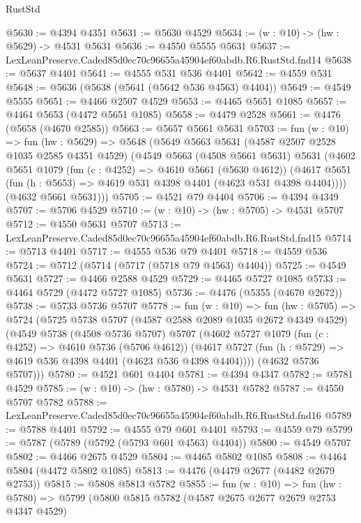 \begin{lexlean}{RustStd}
\begin{coremodule}
@5630 := @4394 @4351
@5631 := @5630 @4529
@5634 := (w : @10) -> (hw : @5629) -> @4531 @5631
@5636 := @4550 @5555 @5631
@5637 := LexLeanPreserve.Caded85d0ec70c96655a45904ef60abdb.R6.RustStd.fnd14
@5638 := @5637 @4401
@5641 := @4555 @531 @536 @4401
@5642 := @4559 @531
@5648 := @5636 (@5638 (@5641 (@5642 @536 @4563) @4404))
@5649 := @4549 @5555
@5651 := @4466 @2507 @4529
@5653 := @4465 @5651 @1085
@5657 := @4464 @5653 (@4472 @5651 @1085)
@5658 := @4479 @2528
@5661 := @4476 (@5658 (@4670 @2585))
@5663 := @5657 @5661 @5631
@5703 := fun (w : @10) =>
  fun (hw : @5629) =>
  @5648
    (@5649
      @5663
      @5631
      (@4587 @2507 @2528 @1035 @2585 @4351 @4529)
      (@4549
        @5663
        (@4508 @5661 @5631)
        @5631
        (@4602
          @5651
          @1079
          (fun (c : @4252) => @4610 @5661 (@5630 @4612))
          (@4617 @5651 (fun (h : @5653) => @4619 @531 @4398 @4401 (@4623 @531 @4398 @4404))))
        (@4632 @5661 @5631)))
@5705 := @4521 @79 @4404
@5706 := @4394 @4349
@5707 := @5706 @4529
@5710 := (w : @10) -> (hw : @5705) -> @4531 @5707
@5712 := @4550 @5631 @5707
@5713 := LexLeanPreserve.Caded85d0ec70c96655a45904ef60abdb.R6.RustStd.fnd15
@5714 := @5713 @4401
@5717 := @4555 @536 @79 @4401
@5718 := @4559 @536
@5724 := @5712 (@5714 (@5717 (@5718 @79 @4563) @4404))
@5725 := @4549 @5631
@5727 := @4466 @2588 @4529
@5729 := @4465 @5727 @1085
@5733 := @4464 @5729 (@4472 @5727 @1085)
@5736 := @4476 (@5355 (@4670 @2672))
@5738 := @5733 @5736 @5707
@5778 := fun (w : @10) =>
  fun (hw : @5705) =>
  @5724
    (@5725
      @5738
      @5707
      (@4587 @2588 @2089 @1035 @2672 @4349 @4529)
      (@4549
        @5738
        (@4508 @5736 @5707)
        @5707
        (@4602
          @5727
          @1079
          (fun (c : @4252) => @4610 @5736 (@5706 @4612))
          (@4617 @5727 (fun (h : @5729) => @4619 @536 @4398 @4401 (@4623 @536 @4398 @4404))))
        (@4632 @5736 @5707)))
@5780 := @4521 @601 @4404
@5781 := @4394 @4347
@5782 := @5781 @4529
@5785 := (w : @10) -> (hw : @5780) -> @4531 @5782
@5787 := @4550 @5707 @5782
@5788 := LexLeanPreserve.Caded85d0ec70c96655a45904ef60abdb.R6.RustStd.fnd16
@5789 := @5788 @4401
@5792 := @4555 @79 @601 @4401
@5793 := @4559 @79
@5799 := @5787 (@5789 (@5792 (@5793 @601 @4563) @4404))
@5800 := @4549 @5707
@5802 := @4466 @2675 @4529
@5804 := @4465 @5802 @1085
@5808 := @4464 @5804 (@4472 @5802 @1085)
@5813 := @4476 (@4479 @2677 (@4482 @2679 @2753))
@5815 := @5808 @5813 @5782
@5855 := fun (w : @10) =>
  fun (hw : @5780) =>
  @5799
    (@5800
      @5815
      @5782
      (@4587 @2675 @2677 @2679 @2753 @4347 @4529)

\end{coremodule}
\end{lexlean}
